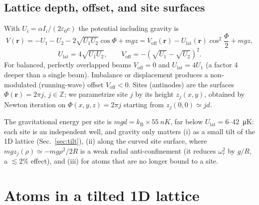 \documentclass[11pt,a4paper]{article}
\newcommand{\kB}{k_\mathrm{B}}
\newcommand{\Ulat}{U_\mathrm{lat}}
\newcommand{\Voff}{V_\mathrm{off}}
\begin{document}
\subsection{Lattice depth, offset, and site surfaces}
With $U_i=\alpha I_i/(2\varepsilon_0c)$ the potential including gravity is
\begin{equation}
V(\bm r) = -U_1-U_2-2\sqrt{U_1U_2}\cos\Phi + mgz
= \Voff(\bm r) - \Ulat(\bm r)\cos^2\!\frac{\Phi}{2} + mgz,
\label{eq:Vfull}
\end{equation}
\begin{equation}
\Ulat=4\sqrt{U_1U_2},\qquad \Voff=-\left(\sqrt{U_1}-\sqrt{U_2}\right)^2 .
\end{equation}
For balanced, perfectly overlapped beams $\Voff=0$ and $\Ulat=4U_1$ (a factor 4 deeper than a single beam). Imbalance or displacement produces a non-modulated (running-wave) offset $\Voff<0$. Sites (antinodes) are the surfaces $\Phi(\bm r)=2\pi j$, $j\in\mathbb Z$; we parametrize site $j$ by its height $z_j(x,y)$, obtained by Newton iteration on $\Phi(x,y,z)=2\pi j$ starting from $z_j(0,0)\simeq jd$.

The gravitational energy per site is $mgd=\kB\times\SI{55}{nK}$, far below $\Ulat=6$--\SI{42}{\micro K}: each site is an independent well, and gravity only matters (i) as a small tilt of the 1D lattice (Sec.~\ref{sec:tilt}), (ii) along the curved site surface, where $mg z_j(\rho)\simeq -mg\rho^2/2R$ is a weak radial anti-confinement (it reduces $\omega_r^2$ by $g/R$, a $\lesssim2\%$ effect), and (iii) for atoms that are no longer bound to a site.

\section{Atoms in a tilted 1D lattice}
\label{sec:lattice}
\end{document}
